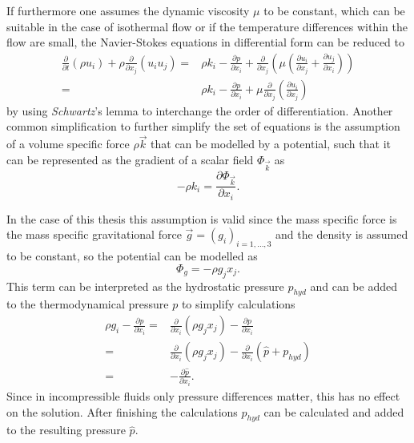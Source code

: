 If furthermore one assumes the dynamic viscosity \(\mu\) to be constant,  which can be suitable in the case of isothermal flow or if the temperature differences within the flow are small, the Navier-Stokes equations in differential form can be reduced to 
\begin{subequations}
\label{eq:navierstokes}
\begin{align}
  \frac{\partial}{\partial t}   \left(\rho u_i \right)
  + \rho \frac{\partial}{\partial x_j} \left( u_i  u_j \right) 
  =& \rho k_i
  - \frac{\partial p}{\partial x_i}
+ \frac{\partial}{\partial x_j} \left( \mu  \left( \frac{\partial u_i}{\partial x_j} 
+ \frac{\partial u_j}{\partial x_i} \right) \right) \\[0.5em]
  =& \rho k_i
  - \frac{\partial p}{\partial x_i}
  + \mu \frac{\partial}{\partial x_j} \left( \frac{\partial u_i}{\partial x_j} \right)
\end{align}
\end{subequations}
by using \emph{Schwartz}'s lemma to interchange the order of differentiation. Another common simplification to further simplify the set of equations is the assumption of a volume specific force \(\rho \vec{k}\) that can be modelled by a potential, such that it can be represented as the gradient of a scalar field \(\Phi_\vec{k}\) as
\begin{displaymath}
 - \rho k_i = \frac{\partial \Phi_\vec{k}}{\partial x_i}.
\end{displaymath}

In the case of this thesis this assumption is valid since the mass specific force is the mass specific gravitational force \(\vec{g} = \left( g_i \right)_{i = 1,\dots,3}\) and the density is assumed to be constant, so the potential can be modelled as
\begin{displaymath}
  \Phi_g = - \rho g_j x_j.
\end{displaymath}
This term can be interpreted as the hydrostatic pressure \(p_{hyd}\) and can be added to the thermodynamical pressure \(p\) to simplify calculations 
\begin{align}
  \rho g_i - \frac{\partial p}{\partial x_i} 
  =& \frac{\partial}{\partial x_i} \left( \rho g_j x_j \right) - \frac{\partial p}{\partial x_i} \nonumber \\[0.5em]
  =& \frac{\partial}{\partial x_i} \left( \rho g_j x_j \right) - \frac{\partial}{\partial x_i}  \left(\hat{p} + p_{hyd} \right) \nonumber \\[0.5em]
  =& - \frac{\partial \hat{p}}{\partial x_i}.
\end{align}
Since in incompressible fluids only pressure differences matter, this has no effect on the solution. After finishing the calculations \(p_{hyd}\) can be calculated and added to the resulting pressure \(\hat{p}\).

